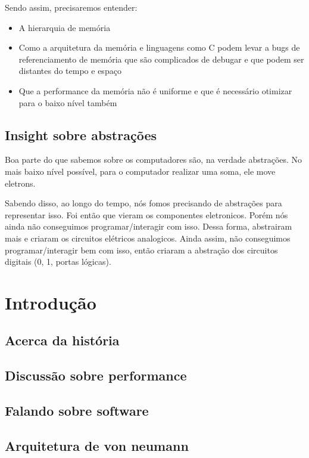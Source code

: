 \documentclass[12pt,a4paper]{report}
\begin{document}
	Sendo assim, precisaremos entender:
	\begin{itemize}
		\item A hierarquia de memória
		\item Como a arquitetura da memória
		e linguagens como C podem levar a bugs de referenciamento de memória que são complicados de debugar e que podem ser distantes do tempo e espaço
		\item Que a performance da memória
		não é uniforme e que é necessário otimizar
		para o baixo nível também
	\end{itemize}  
	
	\section{Insight sobre abstrações}
	Boa parte do que sabemos sobre os computadores são, na verdade abstrações. No mais baixo nível possível, para o computador realizar uma soma, ele move eletrons.
	
	Sabendo disso, ao longo do tempo, nós fomos precisando de abstrações para representar isso. Foi então que vieram os componentes eletronicos. Porém nós ainda não conseguimos programar/interagir com isso. Dessa forma, abstrairam mais e criaram os circuitos elétricos analogicos. Ainda assim, não conseguimos programar/interagir bem com isso, então criaram a abstração dos circuitos digitais (0, 1, portas lógicas).
	
	\chapter{Introdução}
	\section{Acerca da história}
	
	\section{Discussão sobre performance}
	\section{Falando sobre software}
	\section{Arquitetura de von neumann}
	
	
\end{document}
